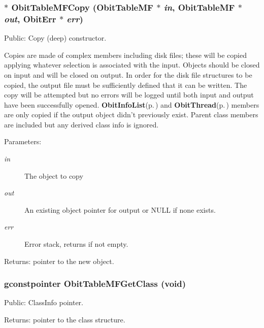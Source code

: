 \subsubsection{$\ast$ Obit\-Table\-MFCopy ({\bf Obit\-Table\-MF} $\ast$ {\em in}, {\bf Obit\-Table\-MF} $\ast$ {\em out}, {\bf Obit\-Err} $\ast$ {\em err})}\label{ObitTableMF_8c_a20}


Public: Copy (deep) constructor. 

Copies are made of complex members including disk files; these will be copied applying whatever selection is associated with the input. Objects should be closed on input and will be closed on output. In order for the disk file structures to be copied, the output file must be sufficiently defined that it can be written. The copy will be attempted but no errors will be logged until both input and output have been successfully opened. {\bf Obit\-Info\-List}{\rm (p.\,\pageref{structObitInfoList})} and {\bf Obit\-Thread}{\rm (p.\,\pageref{structObitThread})} members are only copied if the output object didn't previously exist. Parent class members are included but any derived class info is ignored. \begin{Desc}
\item[Parameters:]
\begin{description}
\item[{\em in}]The object to copy \item[{\em out}]An existing object pointer for output or NULL if none exists. \item[{\em err}]Error stack, returns if not empty. \end{description}
\end{Desc}
\begin{Desc}
\item[Returns:]pointer to the new object. \end{Desc}
\subsubsection{\setlength{\rightskip}{0pt plus 5cm}gconstpointer Obit\-Table\-MFGet\-Class (void)}\label{ObitTableMF_8c_a17}


Public: Class\-Info pointer. 

\begin{Desc}
\item[Returns:]pointer to the class structure. \end{Desc}
